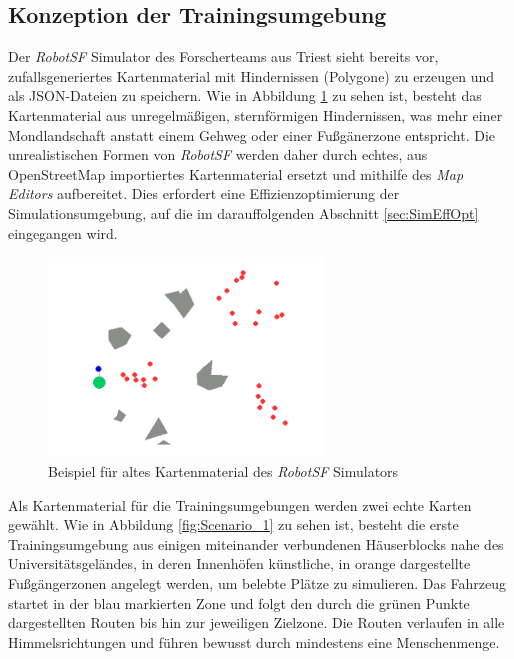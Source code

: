 
\subsection{Konzeption der Trainingsumgebung} \label{sec:TrainingApproach}
Der \emph{RobotSF} Simulator des Forscherteams aus Triest sieht bereits vor,
zufallsgeneriertes Kartenmaterial mit Hindernissen (Polygone) zu erzeugen und
als JSON-Dateien zu speichern. Wie in Abbildung \ref{fig:MapOld} zu sehen ist, besteht
das Kartenmaterial aus unregelmäßigen, sternförmigen Hindernissen, was mehr einer
Mondlandschaft anstatt einem Gehweg oder einer Fußgänerzone entspricht. Die unrealistischen
Formen von \emph{RobotSF} werden daher durch echtes, aus OpenStreetMap importiertes
Kartenmaterial ersetzt und mithilfe des \emph{Map Editors} aufbereitet. Dies erfordert
eine Effizienzoptimierung der Simulationsumgebung, auf die im darauffolgenden Abschnitt
\ref{sec:SimEffOpt} eingegangen wird.

\begin{figure}[h]
  \centering
  \includegraphics[width = 0.65\textwidth]{imgs/kartenmaterial_alt}
  \caption{Beispiel für altes Kartenmaterial des \emph{RobotSF} Simulators}
  \label{fig:MapOld}
\end{figure}

Als Kartenmaterial für die Trainingsumgebungen werden zwei echte Karten gewählt. Wie in
Abbildung \ref{fig:Scenario_1} zu sehen ist, besteht die erste Trainingsumgebung aus
einigen miteinander verbundenen Häuserblocks nahe des Universitätsgeländes, in deren
Innenhöfen künstliche, in orange dargestellte Fußgängerzonen angelegt werden, um belebte
Plätze zu simulieren. Das Fahrzeug startet in der blau markierten Zone und folgt den
durch die grünen Punkte dargestellten Routen bis hin zur jeweiligen Zielzone. Die Routen
verlaufen in alle Himmelsrichtungen und führen bewusst durch mindestens eine Menschenmenge.\\

